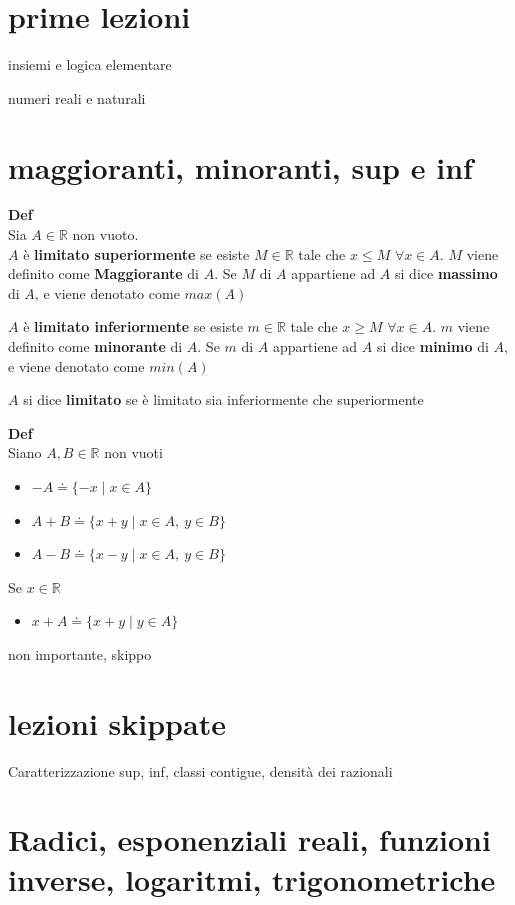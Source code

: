 \documentclass[12pt, a4paper]{article}
\begin{document}
\section{prime lezioni}
insiemi e logica elementare

numeri reali e naturali

\section{maggioranti, minoranti, sup e inf}

\textbf{Def}\\ Sia $A\in\mathbb{R}$ non vuoto.\\ $A$ è \textbf{limitato superiormente} se esiste $M\in\mathbb{R}$
tale che $x\leq M$ $\forall x\in A$. $M$ viene definito come \textbf{Maggiorante} di $A$. Se $M$ di $A$ appartiene
ad $A$ si dice \textbf{massimo} di $A$, e viene denotato come $max(A)$

$A$ è \textbf{limitato inferiormente} se esiste $m\in\mathbb{R}$ tale che $x\geq M$ $\forall x\in A$. $m$ viene
definito come \textbf{minorante} di $A$. Se $m$ di $A$ appartiene ad $A$ si dice \textbf{minimo} di $A$, e viene
denotato come $min(A)$

$A$ si dice \textbf{limitato} se è limitato sia inferiormente che superiormente

\textbf{Def}\\ Siano $A,B\in\mathbb{R}$ non vuoti
\begin{itemize}
    \item $-A \doteq \{-x \mid x\in A\}$
    \item $A+B \doteq \{x+y\mid x\in A,\ y\in B\}$
    \item $A-B \doteq \{x-y\mid x\in A,\ y\in B\}$
\end{itemize}
Se $x\in\mathbb{R}$
\begin{itemize}
    \item $x+A\doteq\{x+y\mid y\in A\}$
\end{itemize}

non importante, skippo

\section{lezioni skippate}
Caratterizzazione sup, inf, classi contigue, densità dei razionali

\section{Radici, esponenziali reali, funzioni inverse, logaritmi, trigonometriche}
\end{document}
